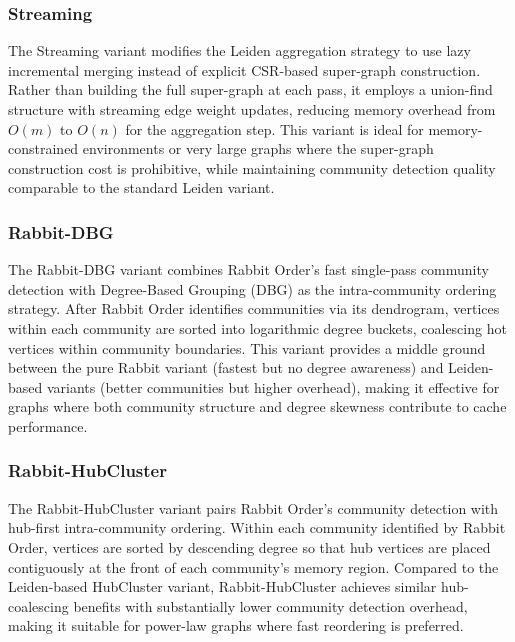 \documentclass[sigconf, nonacm]{acmart}
\begin{document}
\subsubsection{Streaming}
The Streaming variant modifies the Leiden aggregation strategy to use lazy incremental merging instead of explicit CSR-based super-graph construction. Rather than building the full super-graph at each pass, it employs a union-find structure with streaming edge weight updates, reducing memory overhead from $O(m)$ to $O(n)$ for the aggregation step. This variant is ideal for memory-constrained environments or very large graphs where the super-graph construction cost is prohibitive, while maintaining community detection quality comparable to the standard Leiden variant.

\subsubsection{Rabbit-DBG}
The Rabbit-DBG variant combines Rabbit Order's fast single-pass community detection with Degree-Based Grouping (DBG) as the intra-community ordering strategy. After Rabbit Order identifies communities via its dendrogram, vertices within each community are sorted into logarithmic degree buckets, coalescing hot vertices within community boundaries. This variant provides a middle ground between the pure Rabbit variant (fastest but no degree awareness) and Leiden-based variants (better communities but higher overhead), making it effective for graphs where both community structure and degree skewness contribute to cache performance.

\subsubsection{Rabbit-HubCluster}
The Rabbit-HubCluster variant pairs Rabbit Order's community detection with hub-first intra-community ordering. Within each community identified by Rabbit Order, vertices are sorted by descending degree so that hub vertices are placed contiguously at the front of each community's memory region. Compared to the Leiden-based HubCluster variant, Rabbit-HubCluster achieves similar hub-coalescing benefits with substantially lower community detection overhead, making it suitable for power-law graphs where fast reordering is preferred.
\end{document}
